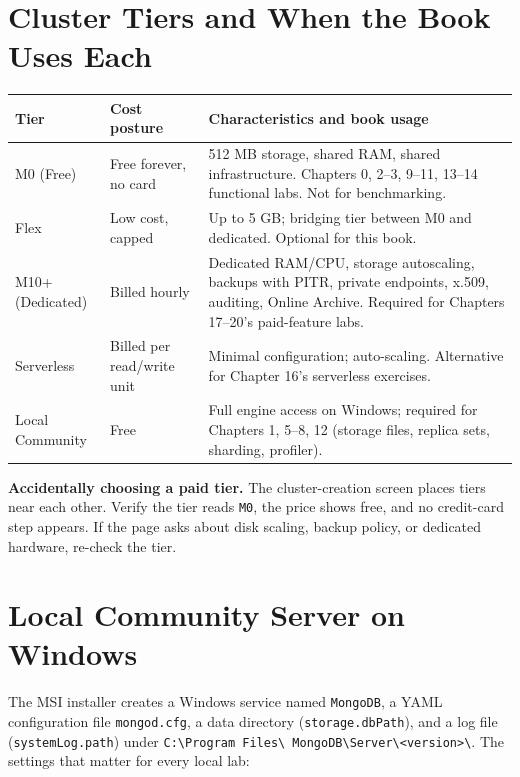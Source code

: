 \section{Cluster Tiers and When the Book Uses Each}
%
\begin{center}
\footnotesize
\begin{tabular}{@{}p{2.2cm}p{3.4cm}p{6.2cm}@{}}
\toprule
\textbf{Tier} & \textbf{Cost posture} & \textbf{Characteristics and book usage} \\
\midrule
M0 (Free) & Free forever, no card & 512 MB storage, shared RAM, shared infrastructure. Chapters 0, 2--3, 9--11, 13--14 functional labs. Not for benchmarking. \\
Flex & Low cost, capped & Up to 5 GB; bridging tier between M0 and dedicated. Optional for this book. \\
M10+ (Dedicated) & Billed hourly & Dedicated RAM/CPU, storage autoscaling, backups with PITR, private endpoints, x.509, auditing, Online Archive. Required for Chapters 17--20's paid-feature labs. \\
Serverless & Billed per read/write unit & Minimal configuration; auto-scaling. Alternative for Chapter 16's serverless exercises. \\
Local Community & Free & Full engine access on Windows; required for Chapters 1, 5--8, 12 (storage files, replica sets, sharding, profiler). \\
\bottomrule
\end{tabular}
\end{center}

\begin{pitfall}
\textbf{Accidentally choosing a paid tier.} The cluster-creation screen places tiers near each
other. Verify the tier reads \texttt{M0}, the price shows free, and no credit-card step appears.
If the page asks about disk scaling, backup policy, or dedicated hardware, re-check the tier.
\end{pitfall}

\section{Local Community Server on Windows}
%
The MSI installer creates a Windows service named \texttt{MongoDB}, a YAML configuration file
\texttt{mongod.cfg}, a data directory (\texttt{storage.dbPath}), and a log file
(\texttt{systemLog.path}) under \texttt{C:\textbackslash Program Files\textbackslash
MongoDB\textbackslash Server\textbackslash <version>\textbackslash}. The settings that matter for
every local lab:

